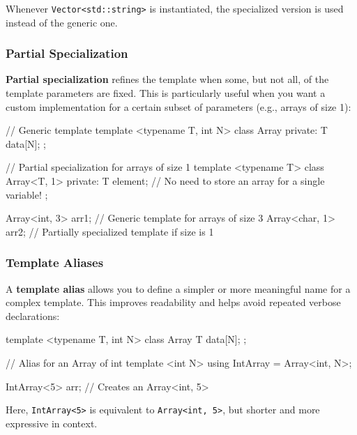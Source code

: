 Whenever \texttt{Vector<std::string>} is instantiated, the specialized version is used instead of the generic one.

\subsubsection{Partial Specialization}

\textbf{Partial specialization} refines the template when some, but not all, of the template parameters are fixed. This is particularly useful when you want a custom implementation for a certain subset of parameters (e.g., arrays of size 1):

\begin{codeblock}[language=C++]
// Generic template
template <typename T, int N>
class Array {
private:
    T data[N];
};

// Partial specialization for arrays of size 1
template <typename T>
class Array<T, 1> {
private:
    T element; // No need to store an array for a single variable!
};

Array<int, 3> arr1;  // Generic template for arrays of size 3
Array<char, 1> arr2; // Partially specialized template if size is 1
\end{codeblock}



\subsubsection{Template Aliases}

A \textbf{template alias} allows you to define a simpler or more meaningful name for a complex template. This improves readability and helps avoid repeated verbose declarations:

\begin{codeblock}[language=C++, numbers=none]
template <typename T, int N>
class Array {
    T data[N];
};

// Alias for an Array of int
template <int N>
using IntArray = Array<int, N>;

IntArray<5> arr; // Creates an Array<int, 5>
\end{codeblock}

Here, \texttt{IntArray<5>} is equivalent to \texttt{Array<int, 5>}, but shorter and more expressive in context.

